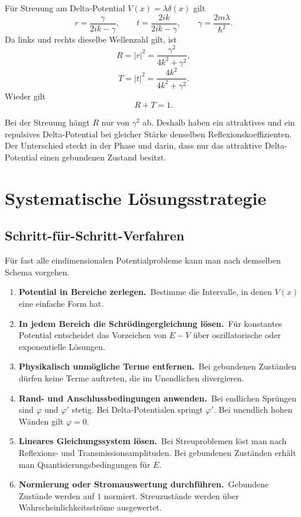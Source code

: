 \begin{formulabox}
Für Streuung am Delta-Potential $V(x)=\lambda\delta(x)$ gilt
\[
    r=\frac{\gamma}{2ik-\gamma},
    \qquad
    t=\frac{2ik}{2ik-\gamma},
    \qquad
    \gamma=\frac{2m\lambda}{\hbar^2}.
\]
Da links und rechts dieselbe Wellenzahl gilt, ist
\[
    R=|r|^2=\frac{\gamma^2}{4k^2+\gamma^2},
\]
\[
    T=|t|^2=\frac{4k^2}{4k^2+\gamma^2}.
\]
Wieder gilt
\[
    R+T=1.
\]
\end{formulabox}

\begin{notebox}
Bei der Streuung hängt $R$ nur von $\gamma^2$ ab. Deshalb haben ein attraktives und ein repulsives Delta-Potential bei gleicher Stärke denselben Reflexionskoeffizienten. Der Unterschied steckt in der Phase und darin, dass nur das attraktive Delta-Potential einen gebundenen Zustand besitzt.
\end{notebox}

\section{Systematische Lösungsstrategie}

\subsection{Schritt-für-Schritt-Verfahren}

Für fast alle eindimensionalen Potentialprobleme kann man nach demselben Schema vorgehen.

\begin{enumerate}
    \item \textbf{Potential in Bereiche zerlegen.}\
    Bestimme die Intervalle, in denen $V(x)$ eine einfache Form hat.

    \item \textbf{In jedem Bereich die Schrödingergleichung lösen.}\
    Für konstantes Potential entscheidet das Vorzeichen von $E-V$ über oszillatorische oder exponentielle Lösungen.

    \item \textbf{Physikalisch unmögliche Terme entfernen.}\
    Bei gebundenen Zuständen dürfen keine Terme auftreten, die im Unendlichen divergieren.

    \item \textbf{Rand- und Anschlussbedingungen anwenden.}\
    Bei endlichen Sprüngen sind $\varphi$ und $\varphi'$ stetig. Bei Delta-Potentialen springt $\varphi'$. Bei unendlich hohen Wänden gilt $\varphi=0$.

    \item \textbf{Lineares Gleichungssystem lösen.}\
    Bei Streuproblemen löst man nach Reflexions- und Transmissionsamplituden. Bei gebundenen Zuständen erhält man Quantisierungsbedingungen für $E$.

    \item \textbf{Normierung oder Stromauswertung durchführen.}\
    Gebundene Zustände werden auf $1$ normiert. Streuzustände werden über Wahrscheinlichkeitsströme ausgewertet.
\end{enumerate}

